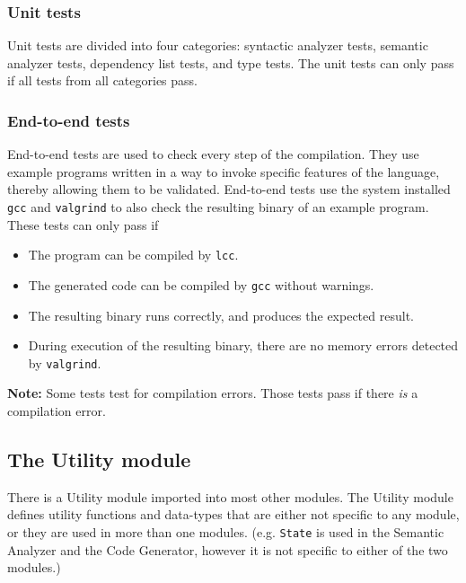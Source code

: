 \documentclass[12pt]{article}
\begin{document}
\subsubsection{Unit tests}

Unit tests are divided into four categories: syntactic analyzer tests, semantic
analyzer tests, dependency list tests, and type tests. The unit tests can only
pass if all tests from all categories pass.

\subsubsection{End-to-end tests}

End-to-end tests are used to check every step of the compilation. They use
example programs written in a way to invoke specific features of the language,
thereby allowing them to be validated. End-to-end tests use the system installed
\verb$gcc$ and \verb$valgrind$ to also check the resulting binary of an example
program. These tests can only pass if
\begin{itemize}
    \item The program can be compiled by \verb$lcc$.
    \item The generated code can be compiled by \verb$gcc$ without warnings.
    \item The resulting binary runs correctly, and produces the expected result.
    \item During execution of the resulting binary, there are no memory errors
        detected by \verb$valgrind$.
\end{itemize}
\textbf{Note:} Some tests test for compilation errors. Those tests pass if there
\emph{is} a compilation error.

\subsection{The Utility module}

There is a Utility module imported into most other modules. The Utility module
defines utility functions and data-types that are either not specific to any module, or they
are used in more than one modules. (e.g. \verb$State$ is used in the Semantic
Analyzer and the Code Generator, however it is not specific to either of the two
modules.)
\end{document}
